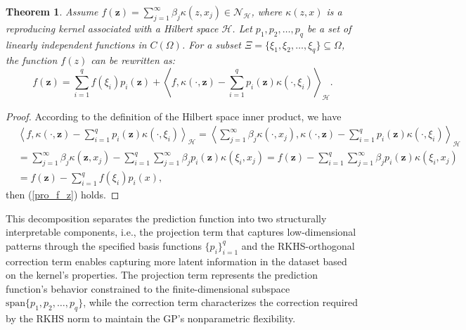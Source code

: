 \documentclass[preprint,review,sort&compress,3p]{elsarticle}
\newtheorem{thm}{Theorem }[section]
\begin{document}
\begin{thm}
	\label{thm_Xi}
	Assume $f(\boldsymbol{z}) = \sum\limits_{j=1}^{\infty} \beta_j \kappa (z,x_j) \in \mathcal{N}_\mathcal{H}$, where $\kappa(z,x)$ is a reproducing kernel associated with a Hilbert space $\mathcal{H}$. Let  $p_1,p_2,\dots,p_q$ be a set of linearly independent functions in $C(\Omega)$. 
	For a subset $\Xi = \{\xi_1,\xi_2,\dots,\xi_q \} \subseteq \Omega$, the function $f(z)$ can be rewritten as:
	\begin{equation}
		\label{pro_f_z}
		f(\boldsymbol{z}) = \sum\limits_{i = 1}^q f(\xi_i) p_i(\boldsymbol{z}) +\left\langle f,\kappa(\cdot,\boldsymbol{z})-\sum\limits_{i= 1}^q p_i(\boldsymbol{z})\kappa(\cdot,\xi_i) \right\rangle_\mathcal{H}.
	\end{equation}
	
\end{thm}
\begin{proof}
	According to the definition of the Hilbert space inner product, we have
	$$
	\begin{aligned}
		&\left\langle f,\kappa(\cdot,\boldsymbol{z})-\sum\limits_{i= 1}^q p_i(\boldsymbol{z})\kappa(\cdot,\xi_i) 	\right\rangle_\mathcal{H} 
		= \left\langle \sum\limits_{j = 1}^{\infty}\beta_j \kappa(\cdot,x_j) ,\kappa(\cdot,\boldsymbol{z})-\sum\limits_{i= 1}^q p_i(\boldsymbol{z})\kappa(\cdot,\xi_i) \right\rangle_\mathcal{H} \\
		&= \sum\limits_{j = 1}^{\infty} \beta_j \kappa(\boldsymbol{z},x_j) - \sum\limits_{i = 1}^q \sum\limits_{j = 1}^{\infty} \beta_j p_i(\boldsymbol{z}) \kappa(\xi_i,x_j)
		= f(\boldsymbol{z}) - \sum\limits_{i = 1}^q \sum\limits_{j = 1}^{\infty} \beta_j p_i(\boldsymbol{z}) \kappa(\xi_i,x_j)\\
		&= f(\boldsymbol{z}) - \sum\limits_{i = 1}^q f(\xi_i) p_i(x),
	\end{aligned}
	$$
	then (\ref{pro_f_z}) holds.
\end{proof}

This decomposition separates the prediction function into two structurally interpretable components, i.e., the projection term that captures low-dimensional patterns through the specified basis functions $\{p_i\}_{i = 1}^q$ and the RKHS-orthogonal correction term enables capturing more latent information in the dataset based on the kernel's properties.
The projection term represents the prediction function's behavior constrained to the finite-dimensional subspace $\text{span} \{p_1,p_2,\dots, p_q\}$, while the correction term characterizes the correction required by the RKHS norm to maintain the GP's nonparametric flexibility.
\end{document}
